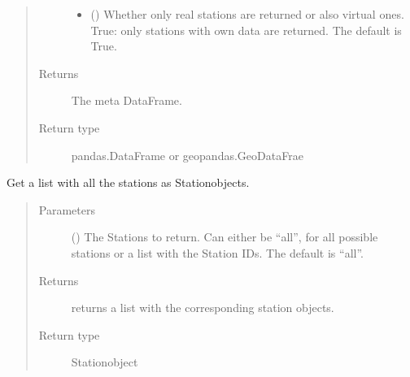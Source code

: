 \documentclass[letterpaper,10pt,english]{sphinxmanual}
\begin{document}
\begin{fulllineitems}
\begin{fulllineitems}
\begin{quote}
\begin{description}
\begin{itemize}
\item {} 
\sphinxAtStartPar
{} (\sphinxstyleliteralemphasis{\sphinxupquote{, }}) \textendash{} Whether only real stations are returned or also virtual ones.
True: only stations with own data are returned.
The default is True.

\end{itemize}

\item[{Returns}] \leavevmode
\sphinxAtStartPar
The meta DataFrame.

\item[{Return type}] \leavevmode
\sphinxAtStartPar
pandas.DataFrame or geopandas.GeoDataFrae

\end{description}\end{quote}

\end{fulllineitems}


\begin{fulllineitems}
\label{\detokenize{weatherDB:weatherDB.stations.GroupStations.get_stations}}
\sphinxAtStartPar
Get a list with all the stations as Station\sphinxhyphen{}objects.
\begin{quote}\begin{description}
\item[{Parameters}] \leavevmode
\sphinxAtStartPar
{} (\sphinxstyleliteralemphasis{\sphinxupquote{, }}) \textendash{} The Stations to return.
Can either be “all”, for all possible stations
or a list with the Station IDs.
The default is “all”.

\item[{Returns}] \leavevmode
\sphinxAtStartPar
returns a list with the corresponding station objects.

\item[{Return type}] \leavevmode
\sphinxAtStartPar
Station\sphinxhyphen{}object


\end{description}
\end{quote}
\end{fulllineitems}
\end{fulllineitems}
\end{document}
